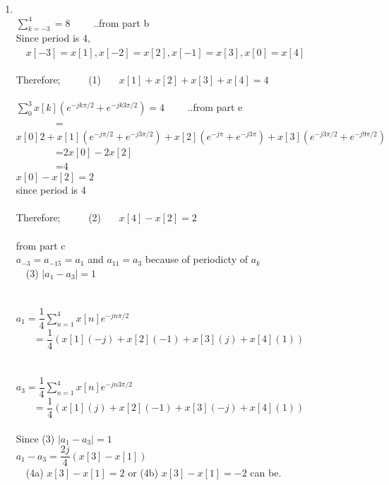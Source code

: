 \documentclass[10pt,a4paper, margin=1in]{article}
\begin{document}
\begin{enumerate}
\item %
\ \\
	$\sum_{k=-3}^{4} = 8$ \ \ \ \ ..from part b \\
	Since period is 4,\\
	\ \ $x[-3]=x[1],x[-2]=x[2],x[-1]=x[3],x[0]=x[4]$\\
	\ \\
	Therefore;
	\null \ \ \ \ \qquad \ \qquad (1) \ \ \ $x[1]+x[2]+x[3]+x[4]=4$\\
	\ \\
	$\sum_{0}^{3} x[k](e^{-jk\pi/2} + e^{-jk3\pi/2}) = 4$ \ \ \ \ ..from part e\\ 
	\null \qquad \ \qquad \ \qquad \ \qquad \ \qquad\ \ \ \ =$x[0]2+x[1](e^{-j\pi/2} + e^{-j3\pi/2}) + x[2](e^{-j\pi} + e^{-j3\pi}) + x[3](e^{-j3\pi/2} + e^{-j9\pi/2})$\\
	\null \qquad \ \qquad \ \qquad \ \qquad \ \qquad\ \ \ \ =$2x[0]-2x[2]$\\
	\null \qquad \ \qquad \ \qquad \ \qquad \ \qquad\ \ \ \ =$4$\\
	$x[0]-x[2]=2$\\
	since period is 4\\
	\ \\
	Therefore; 	\null \ \ \ \ \qquad \ \qquad (2) \ \ \ $x[4]-x[2]=2$\\
	\ \\
	from part c\\
	$a_{-3}=a_{-15}=a_1$ and $a_{11}=a_3$ because of periodicty of $a_k$ \\
	\null \qquad \ \qquad \ \qquad \qquad \qquad (3) $|a_1-a_3|=1$\\
	\ \\
	\ \\
	$a_1 = \dfrac{1}{4} \sum_{n=1}^{4} x[n]e^{-jn\pi/2} $\\
	\null \ \ \ \ = $\dfrac{1}{4} ( x[1](-j) + x[2](-1) + x[3](j) + x[4](1))$\\
	\ \\
	\ \\
	$a_3 = \dfrac{1}{4} \sum_{n=1}^{4} x[n]e^{-jn3\pi/2} $\\
	\null \ \ \ \ = $\dfrac{1}{4} ( x[1](j) + x[2](-1) + x[3](-j) + x[4](1))$\\
	\ \\
	Since (3) $|a_1-a_3|=1$\\
	\null \quad $a_1-a_3 = \dfrac{2j}{4}(x[3]-x[1])$\\
	\null \qquad \ \qquad \ \qquad \qquad \qquad (4a) $x[3]-x[1]=2$ \quad or \quad (4b) $x[3]-x[1]=-2 $ can be.\\

\end{enumerate}
\end{document}
